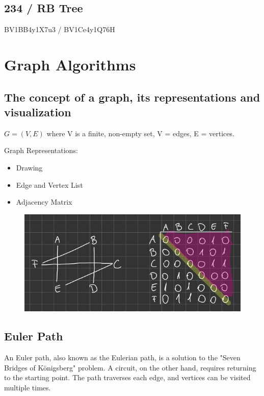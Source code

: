 \documentclass[11pt,journal,compsoc]{IEEEtran}
\begin{document}
\subsection{234 / RB Tree}

BV1BB4y1X7u3 / BV1Ce4y1Q76H


\section{Graph Algorithms}


\subsection{The concept of a graph, its representations and visualization}

$G=(V,E)$ where V is a finite, non-empty set, V = edges, E = vertices.

Graph Representations:

\begin{itemize}
    \item Drawing
    \item Edge and Vertex List
    \item Adjacency Matrix
\end{itemize}

\begin{figure}
    \centering
    \includegraphics[width=\linewidth]{1.png}
\end{figure}


\subsection{Euler Path}

An Euler path, also known as the Eulerian path, is a solution to the "Seven Bridges of Königsberg" problem. A circuit, on the other hand, requires returning to the starting point. The path traverses each edge, and vertices can be visited multiple times.
\end{document}
